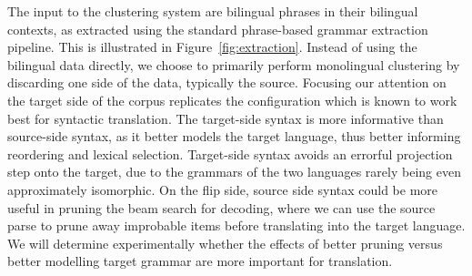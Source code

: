 The input to the clustering system are bilingual phrases in their bilingual contexts, as extracted using the standard phrase-based grammar extraction pipeline. This is illustrated in Figure~\ref{fig:extraction}. Instead of using the bilingual data directly, we choose to primarily perform monolingual clustering by discarding one side of the data, typically the source. Focusing our attention on the target side of the corpus replicates the configuration which is known to work best for syntactic translation. The target-side syntax is more informative than source-side syntax, as it better models the target language, thus better informing reordering and lexical selection. Target-side syntax avoids an errorful projection step onto the target, due to the grammars of the two languages rarely being even approximately isomorphic. On the flip side, source side syntax could be more useful in pruning the beam search for decoding, where we can use the source parse to prune away improbable items before translating into the target language. We will determine experimentally whether the effects of better pruning versus better modelling target grammar are more important for translation.

